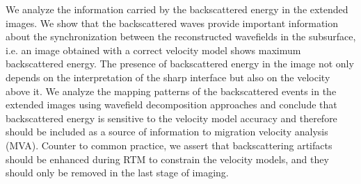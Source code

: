 We analyze the information carried by the backscattered energy in the extended
 images. We show that the backscattered waves provide important information about the 
synchronization between the reconstructed wavefields in the subsurface, i.e. an image obtained with a correct velocity model shows maximum backscattered
energy. The presence of backscattered energy in the image not only depends on the interpretation
of the sharp interface but also on the velocity above it. We analyze the mapping patterns of the backscattered
events in the extended images using wavefield decomposition approaches and conclude that backscattered energy
is sensitive to the velocity model accuracy and therefore should be included as a source
of information to migration velocity analysis (MVA). Counter to common practice, we assert that
backscattering artifacts should be enhanced during RTM to constrain the velocity models,
and they should only be removed in the last stage of imaging.



